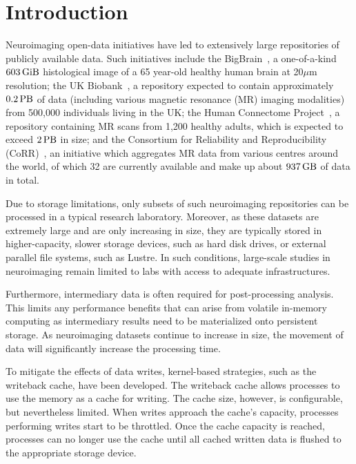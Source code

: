 \documentclass[conference]{IEEEtran}
\newcommand{\bigbrain}{BigBrain\xspace}
\begin{document}
\section{Introduction}
Neuroimaging open-data initiatives have led to extensively large repositories of
publicly available data. Such initiatives include the \bigbrain~\cite{BigBrain}, 
a one-of-a-kind $\SI{603}{\gibi\byte}$
histological image of a 65 year-old healthy human brain
at 20$\mu$m resolution; the UK Biobank~\cite{ukbiobank}, a repository expected to
contain approximately $\SI{0.2}{\peta\byte}$ of data (including various magnetic
resonance (MR) imaging modalities) from 500,000 individuals living in the UK;
the Human Connectome Project~\cite{HCP}, a repository containing MR scans from
1,200 healthy adults, which is expected to exceed $\SI{2}{\peta\byte}$ in size; 
and the Consortium for Reliability and Reproducibility (CoRR)~\cite{corr}, an
initiative which aggregates MR data from various centres around the world, 
of which 32 are currently available and make up about $\SI{937}{\giga\byte}$ of
data in total.

Due to storage limitations, only subsets of such neuroimaging repositories 
can be processed in a typical research laboratory. Moreover, as these datasets 
are extremely large and are only increasing in size, they are typically stored 
in higher-capacity, slower storage devices, such as hard disk drives, or external
parallel file systems, such as Lustre. In such conditions, large-scale 
studies in neuroimaging remain limited to labs with access to adequate 
infrastructures.

Furthermore, intermediary data is often required for post-processing analysis. This limits
any performance benefits that can arise from volatile in-memory computing as intermediary
results need to be materialized onto persistent storage. As neuroimaging datasets continue
to increase in size, the movement of data will significantly increase the processing time.

To mitigate the effects of data writes, kernel-based
strategies, such as the writeback cache, have been developed. The writeback cache
allows processes to use the memory as a cache for writing. The cache size,
however,
is configurable, but nevertheless limited. When writes approach the cache's capacity,
processes performing writes start to be throttled. Once the cache capacity is reached,
processes can no longer use the cache until all cached written data is flushed
to the appropriate storage device.
\end{document}
